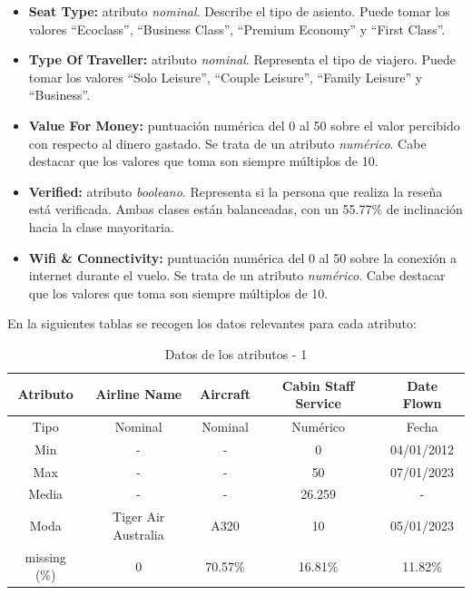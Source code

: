 \documentclass[es]{uc3mreport}
\begin{document}
\begin{report}
\begin{itemize}
    \item \textbf{Seat Type:} atributo \textit{nominal}. Describe el tipo de asiento. Puede tomar los valores ``Ecoclass'',  ``Business Class'', ``Premium Economy'' y ``First Class''.  
    \item \textbf{Type Of Traveller:} atributo \textit{nominal}. Representa el tipo de viajero. Puede tomar los valores ``Solo Leisure'', ``Couple Leisure'', ``Family Leisure'' y ``Business''.
    \item \textbf{Value For Money:} puntuación numérica del 0 al 50 sobre el valor percibido con respecto al dinero gastado. Se trata de un atributo \textit{numérico}. Cabe destacar que los valores que toma son siempre múltiplos de 10.
    \item \textbf{Verified:} atributo \textit{booleano}. Representa si la persona que realiza la reseña está verificada. Ambas clases están balanceadas, con un 55.77\% de inclinación hacia la clase mayoritaria.
    \item \textbf{Wifi \& Connectivity:} puntuación numérica del 0 al 50 sobre la conexión a internet durante el vuelo. Se trata de un atributo \textit{numérico}. Cabe destacar que los valores que toma son siempre múltiplos de 10.
\end{itemize}
En la siguientes tablas se recogen los datos relevantes para cada atributo: 
\begin{table}[H]
    \center
    \begin{tabular}{@{}ccccc@{}}
        \toprule
        Atributo & Airline Name       & Aircraft & Cabin Staff Service & Date Flown \\ 
        \midrule
        Tipo     & Nominal            & Nominal  & Numérico            & Fecha      \\ 
        Min      & -                  & -        & 0                   & 04/01/2012 \\ 
        Max      & -                  & -        & 50                  & 07/01/2023 \\ 
        Media    & -                  & -        & 26.259              & -          \\ 
        Moda     & Tiger Air Australia& A320     & 10                  & 05/01/2023 \\ 
        missing (\%) & 0              & 70.57\%  & 16.81\%             & 11.82\%    \\ 
        \bottomrule
    \end{tabular} 
    \caption{Datos de los atributos - 1}
\end{table}


\end{report}
\end{document}
